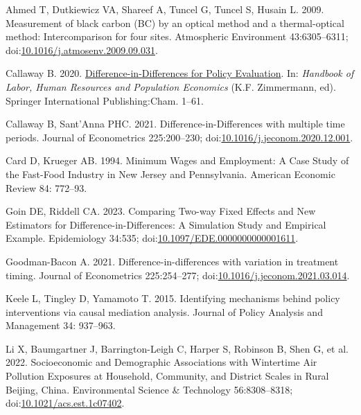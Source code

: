 \documentclass[
  letterpaper,
  DIV=11,
  numbers=noendperiod]{scrartcl}
\newlength{\cslhangindent}
\newenvironment{CSLReferences}[2] %
 {\begin{list}{}{%
  \setlength{\itemindent}{0pt}
  \setlength{\leftmargin}{0pt}
  \setlength{\parsep}{0pt}
  \ifodd #1
   \setlength{\leftmargin}{\cslhangindent}
   \setlength{\itemindent}{-1\cslhangindent}
  \fi
  \setlength{\itemsep}{#2\baselineskip}}}
 {\end{list}}
\begin{document}
\label{refs}
\begin{CSLReferences}{1}{1}
Ahmed T, Dutkiewicz VA, Shareef A, Tuncel G, Tuncel S, Husain L. 2009.
Measurement of black carbon ({BC}) by an optical method and a
thermal-optical method: {Intercomparison} for four sites. Atmospheric
Environment 43:6305--6311;
doi:\href{https://doi.org/10.1016/j.atmosenv.2009.09.031}{10.1016/j.atmosenv.2009.09.031}.

Callaway B. 2020.
\href{https://doi.org/10.1007/978-3-319-57365-6_352-1}{Difference-in-{Differences}
for {Policy Evaluation}}. In: \emph{Handbook of {Labor}, {Human
Resources} and {Population Economics}} (K.F. Zimmermann, ed). {Springer
International Publishing}:{Cham}. 1--61.

Callaway B, Sant'Anna PHC. 2021. Difference-in-{Differences} with
multiple time periods. Journal of Econometrics 225:200--230;
doi:\href{https://doi.org/10.1016/j.jeconom.2020.12.001}{10.1016/j.jeconom.2020.12.001}.

Card D, Krueger AB. 1994. Minimum {Wages} and {Employment}: {A Case
Study} of the {Fast-Food Industry} in {New Jersey} and {Pennsylvania}.
American Economic Review 84: 772--93.

Goin DE, Riddell CA. 2023. Comparing {Two-way Fixed Effects} and {New
Estimators} for {Difference-in-Differences}: {A Simulation Study} and
{Empirical Example}. Epidemiology 34:535;
doi:\href{https://doi.org/10.1097/EDE.0000000000001611}{10.1097/EDE.0000000000001611}.

Goodman-Bacon A. 2021. Difference-in-differences with variation in
treatment timing. Journal of Econometrics 225:254--277;
doi:\href{https://doi.org/10.1016/j.jeconom.2021.03.014}{10.1016/j.jeconom.2021.03.014}.

Keele L, Tingley D, Yamamoto T. 2015. Identifying mechanisms behind
policy interventions via causal mediation analysis. Journal of Policy
Analysis and Management 34: 937--963.

Li X, Baumgartner J, Barrington-Leigh C, Harper S, Robinson B, Shen G,
et al. 2022. Socioeconomic and {Demographic Associations} with
{Wintertime Air Pollution Exposures} at {Household}, {Community}, and
{District Scales} in {Rural Beijing}, {China}. Environmental Science \&
Technology 56:8308--8318;
doi:\href{https://doi.org/10.1021/acs.est.1c07402}{10.1021/acs.est.1c07402}.


\end{CSLReferences}
\end{document}
